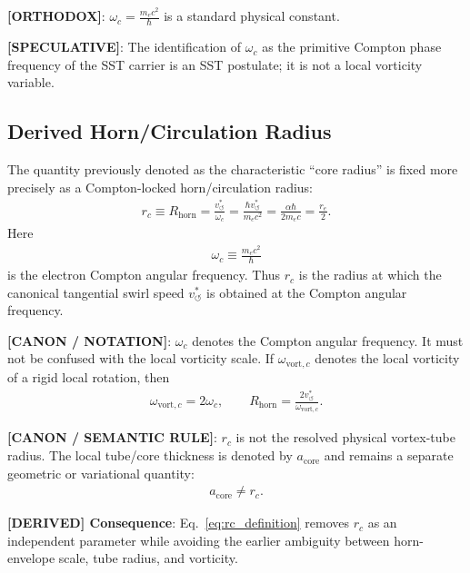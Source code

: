 \documentclass[11pt]{article}
\theoremstyle{definition}
\theoremstyle{plain}
\theoremstyle{remark}
\newcommand{\rc}{{r_c}}
\newcommand{\vchar}{v_{\!\boldsymbol{\circlearrowleft}}^{\ast}}
\begin{document}
        \textbf{[ORTHODOX]}: $\omega_c = \frac{m_e c^2}{\hbar}$ is a standard physical constant.
        
        \textbf{[SPECULATIVE]}: The identification of $\omega_c$ as the primitive Compton phase frequency of the SST carrier is an SST postulate; it is not a local vorticity variable.
    
    \subsection{Derived Horn/Circulation Radius}
        \label{subsec:derived_horn_circulation_radius}

        The quantity previously denoted as the characteristic ``core radius'' is fixed more precisely as a
        Compton-locked horn/circulation radius:
        \begin{align}
            \rc \equiv R_{\mathrm{horn}}
            = \frac{\vchar}{\omega_c}
            = \frac{\hbar\vchar}{m_e c^2}
            = \frac{\alpha\hbar}{2m_e c}
            = \frac{r_e}{2}.
            \label{eq:rc_definition}
        \end{align}
        Here
        \begin{align}
            \omega_c \equiv \frac{m_e c^2}{\hbar}
            \label{eq:omega_c_compton}
        \end{align}
        is the electron Compton angular frequency. Thus $\rc$ is the radius at which the canonical
        tangential swirl speed $\vchar$ is obtained at the Compton angular frequency.

        \textbf{[CANON / NOTATION]}: $\omega_c$ denotes the Compton angular frequency. It must not be confused with the local vorticity scale. If $\omega_{\mathrm{vort},c}$ denotes the local vorticity of a rigid local rotation, then
        \begin{align}
            \omega_{\mathrm{vort},c}=2\omega_c,
            \qquad
            R_{\mathrm{horn}}=\frac{2\vchar}{\omega_{\mathrm{vort},c}}.
        \end{align}

        \textbf{[CANON / SEMANTIC RULE]}: $\rc$ is not the resolved physical vortex-tube radius. The local tube/core thickness is denoted by $a_{\mathrm{core}}$ and remains a separate geometric or variational quantity:
        \begin{align}
            a_{\mathrm{core}} \neq \rc.
        \end{align}

        \textbf{[DERIVED] Consequence}: Eq.~\eqref{eq:rc_definition} removes $\rc$ as an independent parameter while avoiding the earlier ambiguity between horn-envelope scale, tube radius, and vorticity.
    
\end{document}

